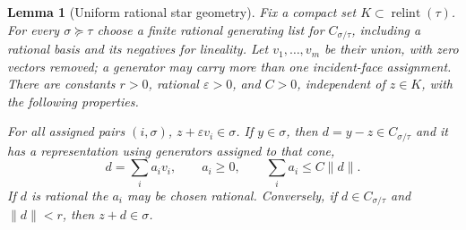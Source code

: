 \documentclass[11pt]{article}
\newtheorem{lemma}[theorem]{Lemma}
\newcommand{\relint}{\operatorname{relint}}
\begin{document}
\begin{lemma}[Uniform rational star geometry]\label{geometry}
Fix a compact set $K\subset\relint(\tau)$. For every $\sigma\succeq\tau$ choose a finite rational generating list for $C_{\sigma/\tau}$, including a rational basis and its negatives for lineality. Let $v_1,\ldots,v_m$ be their union, with zero vectors removed; a generator may carry more than one incident-face assignment. There are constants $r>0$, rational $\varepsilon>0$, and $C>0$, independent of $z\in K$, with the following properties.

For all assigned pairs $(i,\sigma)$, $z+\varepsilon v_i\in\sigma$. If $y\in\sigma$, then $d=y-z\in C_{\sigma/\tau}$ and it has a representation using generators assigned to that cone,
\begin{equation}\label{representation}
 d=\sum_i a_i v_i,\qquad a_i\geq0,\qquad\sum_i a_i\leq C\|d\|.
\end{equation}
If $d$ is rational the $a_i$ may be chosen rational. Conversely, if $d\in C_{\sigma/\tau}$ and $\|d\|<r$, then $z+d\in\sigma$.
\end{lemma}
\end{document}
